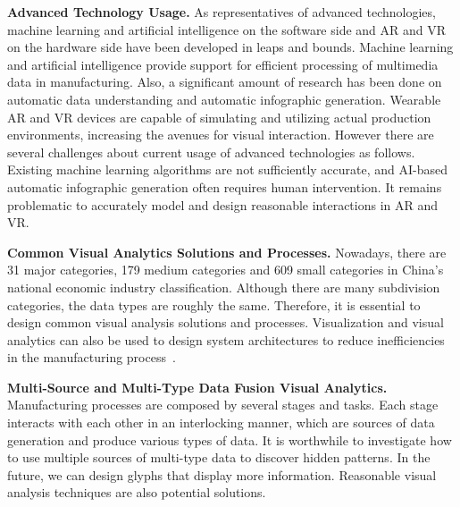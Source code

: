\documentclass[a4paper,fleqn]{cas-dc}
\begin{document}
\textbf{Advanced Technology Usage.}
As representatives of advanced technologies, machine learning and artificial intelligence on the software side and AR and VR on the hardware side have been developed in leaps and bounds.
Machine learning and artificial intelligence provide support for efficient processing of multimedia data in manufacturing. Also, a significant amount of research has been done on automatic data understanding and automatic infographic generation.
Wearable AR and VR devices are capable of simulating and utilizing actual production environments, increasing the avenues for visual interaction.
However there are several challenges about current usage of advanced technologies as follows. Existing machine learning algorithms are not sufficiently accurate, and AI-based automatic infographic generation often requires human intervention. It remains problematic to accurately model and design reasonable interactions in AR and VR. 

\textbf{Common Visual Analytics Solutions and Processes.}
Nowadays, there are 31 major categories, 179 medium categories and 609 small categories in China's national economic industry classification. Although there are many subdivision categories, the data types are roughly the same.
Therefore, it is essential to design common visual analysis solutions and processes.
Visualization and visual analytics can also be used to design system architectures to reduce inefficiencies in the manufacturing process~\cite{Marconi2021,Yao2019}.

\textbf{Multi-Source and Multi-Type Data Fusion Visual Analytics.}
Manufacturing processes are composed by several stages and tasks. Each stage interacts with each other in an interlocking manner, which are sources of data generation and produce various types of data.
It is worthwhile to investigate how to use multiple sources of multi-type data to discover hidden patterns.
In the future, we can design glyphs that display more information. Reasonable visual analysis techniques are also potential solutions.



\end{document}

